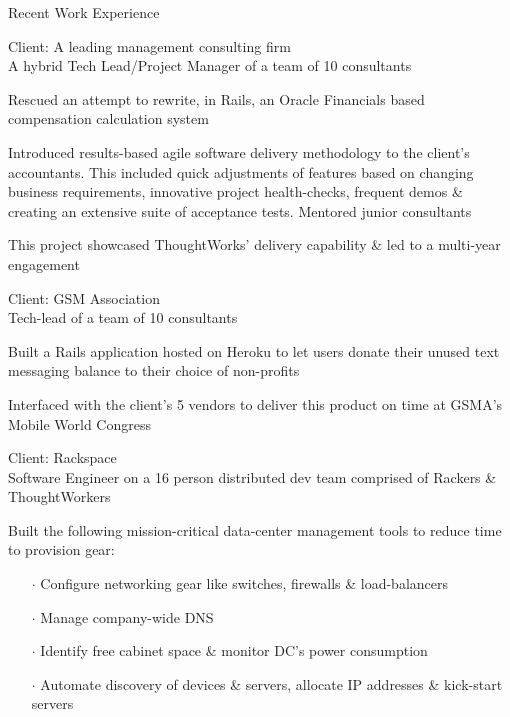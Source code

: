\documentclass{resume} %
\begin{document}
\begin{rSection}{Recent Work Experience}

\begin{rSubsection}{}{}{}{}
  {Client: A leading management consulting firm
    \\A hybrid Tech Lead/Project Manager of a team of 10 consultants}

\item Rescued an attempt to rewrite, in Rails, an Oracle Financials based compensation calculation system
\item Introduced results-based agile software delivery
  methodology to the client's accountants. This included quick
  adjustments of features based on changing business requirements, innovative
  project health-checks, frequent demos \& creating an extensive suite
  of acceptance tests. Mentored junior consultants
\item This project showcased ThoughtWorks' delivery capability \& led to a multi-year engagement

\end{rSubsection}\vspace{-1em}


\begin{rSubsection}{}{}{}{}{Client: GSM Association\\Tech-lead of a team of 10 consultants}
\item Built a Rails application hosted on Heroku to let users donate their unused text messaging balance to their choice of non-profits
  \item Interfaced with the client's 5 vendors to deliver this product on time at GSMA's Mobile World Congress 

\end{rSubsection}\vspace{-1em}



\begin{rSubsection}{}{}{}{}
{Client: Rackspace\\Software Engineer on a 16 person distributed dev team comprised of Rackers \& ThoughtWorkers}

\item Built the following mission-critical data-center management tools to reduce time to provision gear:
\vspace{-0.5em}
\begin{itemize}  \itemsep0.5pt \parskip0pt
    \item[$\cdot$] Configure networking gear like switches, firewalls \& load-balancers
    \item[$\cdot$] Manage company-wide DNS
    \item[$\cdot$] Identify free cabinet space \& monitor DC's power consumption
    \item[$\cdot$] Automate discovery of devices \& servers, allocate IP addresses \& kick-start servers
\end{itemize}


\end{rSubsection}
\end{rSection}
\end{document}
